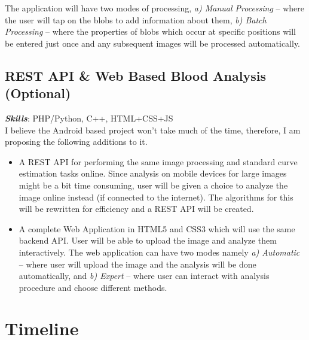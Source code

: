 \documentclass[runningheads,a4paper]{llncs}
\begin{document}
\begin{enumerate}
\end{enumerate}

The application will have two modes of processing, \emph{a) Manual Processing} -- where the user will tap on the blobs to add information about them, \emph{b) Batch Processing} -- where the properties of blobs which occur at specific positions will be entered just once and any subsequent images will be processed automatically.

\subsection{REST API \& Web Based Blood Analysis (Optional)}

\textbf{\emph{Skills}}: PHP/Python, C++, HTML+CSS+JS \\

I believe the Android based project won't take much of the time, therefore, I am proposing the following additions to it. 

\begin{itemize}
\item A REST API for performing the same image processing and standard curve estimation tasks online. Since analysis on mobile devices for large images might be a bit time consuming, user will be given a choice to analyze the image online instead (if connected to the internet). The algorithms for this will be rewritten for efficiency and a REST API will be created.
\item A complete Web Application in HTML5 and CSS3 which will use the same backend API. User will be able to upload the image and analyze them interactively. The web application can have two modes namely \emph{a) Automatic} -- where user will upload the image and the analysis will be done automatically, and \emph{b) Expert} -- where user can interact with analysis procedure and choose different methods.

\end{itemize}

\section{Timeline}
\end{document}
